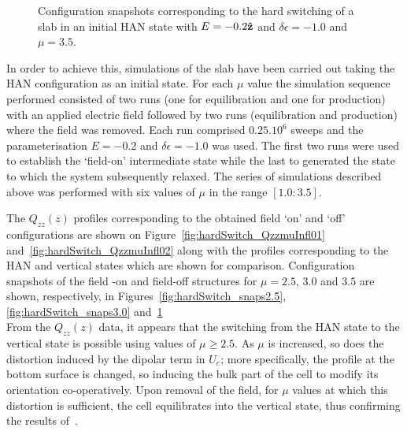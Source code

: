 \begin{figure}
	\centering
	\caption{Configuration snapshots corresponding to the hard switching of a slab in an
	initial HAN state with $E=-0.2\mathbf{\hat{z} }$ and $\delta\epsilon = -1.0$ and $\mu = 3.5$.}
	\label{fig:hardSwitch_snaps3.5}
\end{figure}


In order to achieve this, simulations of the slab have been carried out taking the HAN 
configuration as an initial state. For each $\mu$ value the simulation sequence performed
consisted of two runs (one for equilibration and
one for production) with an applied electric field followed by two runs (equilibration and
production) where the field was removed. Each run comprised $0.25.10^6$ sweeps and the 
parameterisation $E=-0.2$ and $\delta\epsilon = -1.0$ was
used. The first two runs were used to establish the `field-on' intermediate state while the last
to generated the state to which the system subsequently relaxed. 
The series of simulations described above was performed with six values of $\mu$ in the range
$[1.0:3.5]$. 


The $Q_{zz}(z)$ profiles corresponding to the obtained  field `on' and `off' 
configurations are shown on Figure~\ref{fig:hardSwitch_QzzmuInfl01}
and~\ref{fig:hardSwitch_QzzmuInfl02} along with the profiles corresponding to the HAN and
vertical states which are shown for comparison. Configuration snapshots of the field -on and
field-off  structures for $\mu = 2.5$, $3.0$ and $3.5$ are shown, respectively, in 
Figures~\ref{fig:hardSwitch_snaps2.5}, \ref{fig:hardSwitch_snaps3.0} 
and~\ref{fig:hardSwitch_snaps3.5}\\

From the $Q_{zz}(z)$ data, it appears that the switching from the HAN state to the vertical
state is possible using values of $\mu \geq 2.5$. As $\mu$ is increased, so does the 
distortion  induced by the dipolar term in $U_e$; more specifically, the profile at the bottom
surface is changed, so inducing the bulk part of the cell to modify its orientation
co-operatively.
Upon removal of the field, for $\mu$ values at which this distortion is sufficient, 
the cell equilibrates into the
vertical state, thus confirming the results of~\cite{DavidsonMottram02}.


